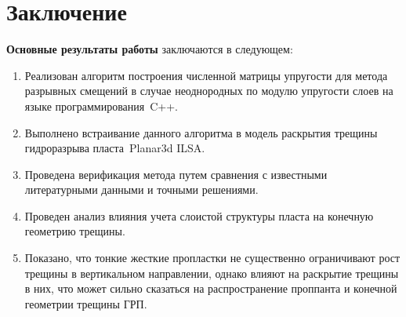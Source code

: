 \chapter*{Заключение}                       %
\label{sec:conclusion} 

\textbf{Основные результаты работы} заключаются в следующем:
\begin{enumerate}
    \item Реализован алгоритм построения численной матрицы упругости для метода разрывных смещений в случае неоднородных по модулю упругости слоев на языке программирования~C++.
    \item Выполнено встраивание данного алгоритма в модель раскрытия трещины гидроразрыва пласта Planar3d ILSA.
    \item Проведена верификация метода путем сравнения с известными литературными данными и точными решениями.
    \item Проведен анализ влияния учета слоистой структуры пласта на конечную геометрию трещины.
    \item Показано, что тонкие жесткие пропластки не существенно ограничивают рост трещины в вертикальном направлении, однако влияют на раскрытие трещины в них, что может сильно сказаться на распространение проппанта и конечной геометрии трещины ГРП. 
\end{enumerate}